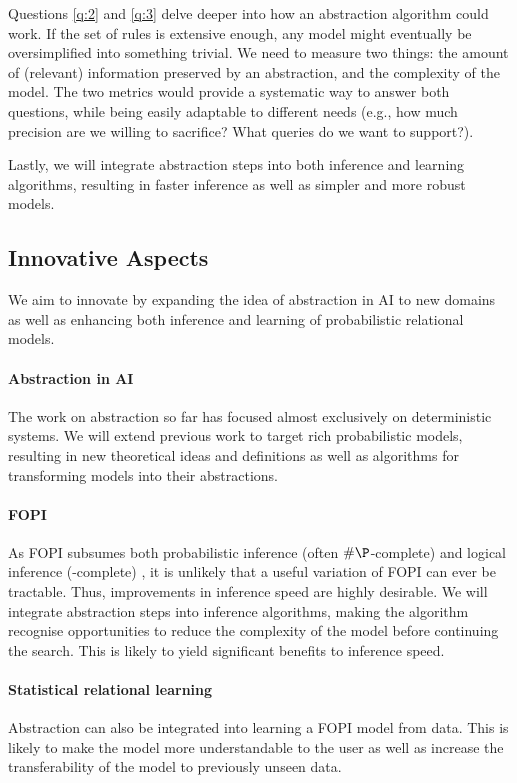 \documentclass{article}
\begin{document}
Questions \ref{q:2} and \ref{q:3} delve deeper into how an abstraction algorithm
could work. If the set of rules is extensive enough, any model might
eventually be oversimplified into something trivial. We need to measure two
things: the amount of (relevant) information preserved by an abstraction, and
the complexity of the model. The two metrics would provide a systematic way to
answer both questions, while being easily adaptable to different needs (e.g.,
how much precision are we willing to sacrifice? What queries do we want to
support?).

Lastly, we will integrate abstraction steps into both inference and learning
algorithms, resulting in faster inference as well as simpler and more robust
models.

\subsection{Innovative Aspects}

We aim to innovate by expanding the idea of abstraction in AI to new domains as
well as enhancing both inference and learning of probabilistic relational
models.

\paragraph{Abstraction in AI} The work on abstraction so far has focused almost
exclusively on deterministic systems. We will extend previous work to target
rich probabilistic models, resulting in new theoretical ideas and definitions as
well as algorithms for transforming models into their abstractions.

\paragraph{FOPI} As FOPI subsumes both probabilistic inference (often
$\#\P$-complete) and logical inference (\NP-complete)
\cite{DBLP:journals/ml/RichardsonD06}, it is unlikely that a useful variation of
FOPI can ever be tractable. Thus, improvements in inference speed are highly
desirable. We will integrate abstraction steps into inference algorithms,
making the algorithm recognise opportunities to reduce the complexity of the
model before continuing the search. This is likely to yield significant benefits
to inference speed.

\paragraph{Statistical relational learning} Abstraction can also be integrated
into learning a FOPI model from data. This is likely to make the model more
understandable to the user as well as increase the transferability of the model
to previously unseen data.
\end{document}
